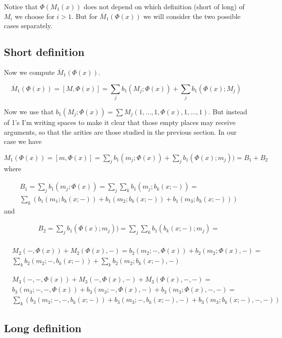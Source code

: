 \documentclass[twoside]{article}
\begin{document}
Notice that $\Phi(M_1(x))$ does not depend on which definition (short of long) of $M_i$ we choose for $i>1$. But for $\overline{M}_1(\Phi(x))$ we will consider the two possible cases separately.

\subsection{Short definition}

Now we compute $\overline{M}_1(\Phi(x))$.

$$\overline{M}_1(\Phi(x))=[M,\Phi(x)]=\sum_j b_1(M_j;\Phi(x))+\sum_j b_1(\Phi(x);M_j)$$

Now we use that $b_1(M_j;\Phi(x))=\sum M_j(1,\dots, 1,\Phi(x),1,\dots, 1)$. But instead of 1's I'm writing spaces to make it clear that those empty places may receive arguments, so that the arities are those studied in the previous section. In our case we have

$
M_1(\Phi(x))=[m,\Phi(x)]=\sum_j b_1(m_j;\Phi(x))+\sum_j b_1(\Phi(x);m_j))=B_1+B_2
$
where

\begin{align*}
&B_1=\sum_j b_1(m_j;\Phi(x))=\sum_j\sum_k b_1(m_j;b_k(x;-))=\\
&\sum_k(b_1(m_1;b_k(x;-))+b_1(m_2;b_k(x;-))+b_1(m_3;b_k(x;-)))
\end{align*}
and

\begin{align*}
&B_2=\sum_j b_1(\Phi(x);m_j))=\sum_j\sum_k b_1(b_k(x;-);m_j)=\\
\end{align*}

\begin{align*}
&M_2(-,\Phi(x))+M_2(\Phi(x),-)=b_2(m_2;-,\Phi(x))+b_2(m_2;\Phi(x),-)=\\
&\sum_k b_2(m_2; -,b_k(x;-))+\sum_k b_2(m_2;b_k(x;-),-)
\end{align*}

\begin{align*}
&M_3(-,-,\Phi(x))+M_3(-,\Phi(x),-)+M_3(\Phi(x),-,-)=\\
&b_3(m_3;-,-,\Phi(x))+b_3(m_3;-,\Phi(x),-)+b_3(m_3;\Phi(x),-,-)=\\
&\sum_k (b_3(m_3; -,-,b_k(x;-))+ b_3(m_3;-,b_k(x;-),-)+b_3(m_3;b_k(x;-),-,-))
\end{align*}
\subsection{Long definition}
\end{document}
